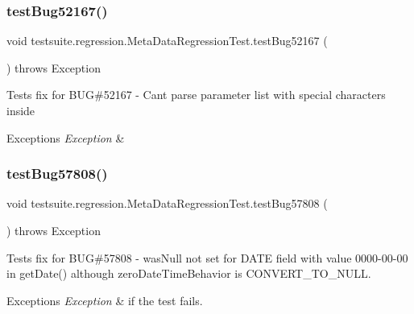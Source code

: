 \subsubsection{\texorpdfstring{test\+Bug52167()}{testBug52167()}}
{\footnotesize\ttfamily void testsuite.\+regression.\+Meta\+Data\+Regression\+Test.\+test\+Bug52167 (\begin{DoxyParamCaption}{ }\end{DoxyParamCaption}) throws Exception}

Tests fix for B\+UG\#52167 -\/ Can\textquotesingle{}t parse parameter list with special characters inside


\begin{DoxyExceptions}{Exceptions}
{\em Exception} & \\
\hline
\end{DoxyExceptions}
\mbox{\label{classtestsuite_1_1regression_1_1_meta_data_regression_test_ade987f06121aa11b35ee8860ae893a51}} 
\subsubsection{\texorpdfstring{test\+Bug57808()}{testBug57808()}}
{\footnotesize\ttfamily void testsuite.\+regression.\+Meta\+Data\+Regression\+Test.\+test\+Bug57808 (\begin{DoxyParamCaption}{ }\end{DoxyParamCaption}) throws Exception}

Tests fix for B\+UG\#57808 -\/ was\+Null not set for D\+A\+TE field with value 0000-\/00-\/00 in get\+Date() although zero\+Date\+Time\+Behavior is C\+O\+N\+V\+E\+R\+T\+\_\+\+T\+O\+\_\+\+N\+U\+LL.


\begin{DoxyExceptions}{Exceptions}
{\em Exception} & if the test fails. \\
\hline
\end{DoxyExceptions}
\mbox{\label{classtestsuite_1_1regression_1_1_meta_data_regression_test_ab171769c1d241e02730a4b626b9bd150}} 
